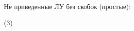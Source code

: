 \begin{ex}[type=multi]
	\begin{condition}
		Не приведенные ЛУ без скобок (простые):
		\begin{tasks}(3)
			\task {}
			\task {}
			\task {}
			\task {}
			\task {}
			\task {}
			\task {}
			\task {}
			\task {}
			\task {}
			\task {}
			\task {}
			\task {}
			\task {}
			\task {}
			\task {}
			\task {}
		\end{tasks}
	\end{condition}
\end{ex}